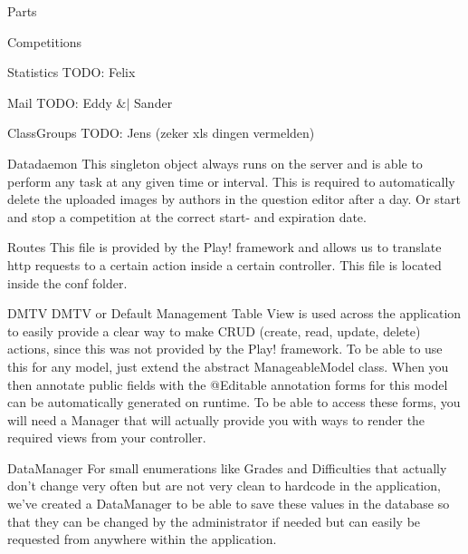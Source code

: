 \documentclass[]{article}
\begin{document}
\begin{section}{Parts}
\begin{subsection}{Competitions}
    \end{subsection}
    \begin{subsection}{Statistics}
        TODO: Felix
    \end{subsection}
    \begin{subsection}{Mail}
        TODO: Eddy $\&|$ Sander
    \end{subsection}
    \begin{subsection}{ClassGroups}
        TODO: Jens (zeker xls dingen vermelden)
    \end{subsection}
    \begin{subsection}{Datadaemon}
        This singleton object always runs on the server and is able to perform
        any task at any given time or interval. This is required to automatically delete
        the uploaded images by authors in the question editor after a day. Or start and
        stop a competition at the correct start- and expiration date.
    \end{subsection}
    \begin{subsection}{Routes}
        This file is provided by the Play! framework and allows us to translate http requests
        to a certain action inside a certain controller.
        This file is located inside the conf folder.
    \end{subsection}
    \begin{subsection}{DMTV}
        DMTV or Default Management Table View is used across the application to easily
        provide a clear way to make CRUD (create, read, update, delete) actions, since this
        was not provided by the Play! framework.
        To be able to use this for any model, just extend the abstract ManageableModel class.
        When you then annotate public fields with the @Editable annotation forms for this model
        can be automatically generated on runtime. To be able to access these forms, you will
        need a Manager that will actually provide you with ways to render the required
        views from your controller.
    \end{subsection}
    \begin{subsection}{DataManager}
        For small enumerations like Grades and Difficulties that actually don't change very
        often but are not very clean to hardcode in the application, we've created a DataManager
        to be able to save these values in the database so that they can be changed by the
        administrator if needed but can easily be requested from anywhere within the application.
    \end{subsection}
\end{section}
\end{document}
